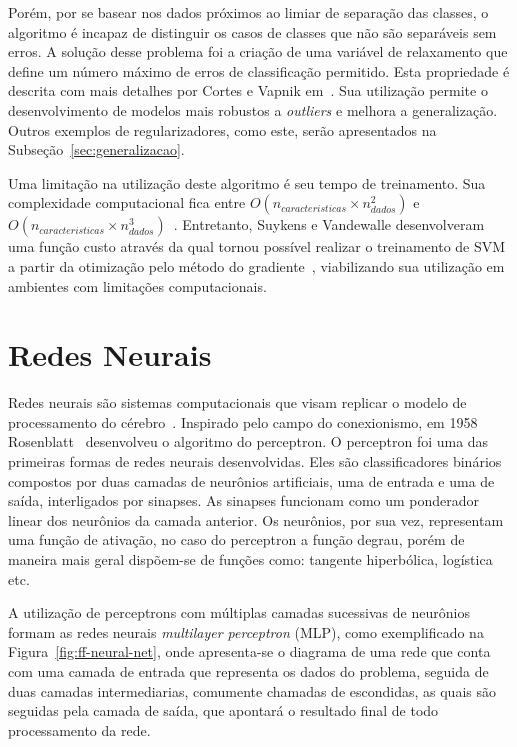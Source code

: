 Porém, por se basear nos dados próximos ao limiar de separação das classes, o algoritmo é incapaz de distinguir os casos
de classes que não são separáveis sem erros.
A solução desse problema foi a criação de uma variável de relaxamento que define um número máximo de erros de
classificação permitido.
Esta propriedade é descrita com mais detalhes por Cortes e Vapnik em~\cite{cortes95}.
Sua utilização permite o desenvolvimento de modelos mais robustos a \textit{outliers} e melhora a generalização.
Outros exemplos de regularizadores, como este, serão apresentados na Subseção~\ref{sec:generalizacao}.

Uma limitação na utilização deste algoritmo é seu tempo de treinamento.
Sua complexidade computacional fica entre $O(n_{caracteristicas} \times n_{dados}^2)$ e
$O(n_{caracteristicas} \times n_{dados}^3)$~\cite{list09}.
Entretanto, Suykens e Vandewalle desenvolveram uma função custo através da qual tornou possível realizar o treinamento
de SVM a partir da otimização pelo método do gradiente~\cite{suykens99}, viabilizando sua utilização em ambientes com
limitações computacionais.


\section{Redes Neurais} \label{sec:nn}

Redes neurais são sistemas computacionais que visam replicar o modelo de processamento do cérebro~\cite{wiener61}.
Inspirado pelo campo do conexionismo, em 1958 Rosenblatt~\cite{rosenblatt58} desenvolveu o algoritmo do perceptron.
O perceptron foi uma das primeiras formas de redes neurais desenvolvidas.
Eles são classificadores binários compostos por duas camadas de neurônios artificiais, uma de entrada e uma de saída,
interligados por sinapses.
As sinapses funcionam como um ponderador linear dos neurônios da camada anterior.
Os neurônios, por sua vez, representam uma função de ativação, no caso do perceptron a função degrau, porém de maneira
mais geral dispõem-se de funções como: tangente hiperbólica, logística etc.

A utilização de perceptrons com múltiplas camadas sucessivas de neurônios formam as redes neurais
\textit{multilayer perceptron} (MLP), como exemplificado na Figura~\ref{fig:ff-neural-net}, onde apresenta-se o diagrama
de uma rede que conta com uma camada de entrada que representa os dados do problema, seguida de duas camadas
intermediarias, comumente chamadas de escondidas, as quais são seguidas pela camada de saída, que apontará o resultado
final de todo processamento da rede.

